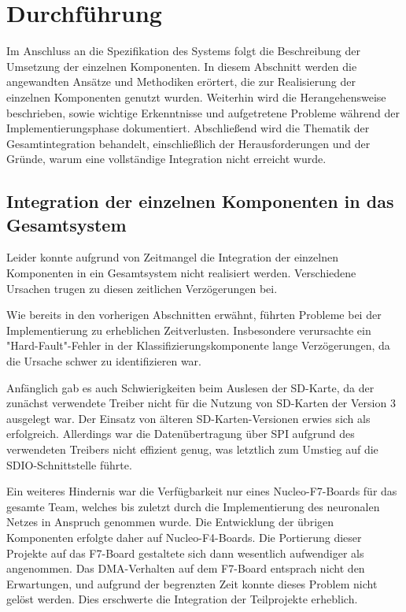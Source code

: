 \newpage
\section{Durchführung}
Im Anschluss an die Spezifikation des Systems folgt die Beschreibung der Umsetzung der einzelnen Komponenten. In diesem Abschnitt werden die angewandten Ansätze und Methodiken erörtert, die zur Realisierung der einzelnen Komponenten genutzt wurden. Weiterhin wird die Herangehensweise beschrieben, sowie wichtige Erkenntnisse und aufgetretene Probleme während der Implementierungsphase dokumentiert. Abschließend wird die Thematik der Gesamtintegration behandelt, einschließlich der Herausforderungen und der Gründe, warum eine vollständige Integration nicht erreicht wurde.







\subsection{Integration der einzelnen Komponenten in das Gesamtsystem}
\label{sec:no-gesamtintegration}
\vspace{1em}

Leider konnte aufgrund von Zeitmangel die Integration der einzelnen Komponenten in ein Gesamtsystem nicht realisiert werden. Verschiedene Ursachen trugen zu diesen zeitlichen Verzögerungen bei.

Wie bereits in den vorherigen Abschnitten erwähnt, führten Probleme bei der Implementierung zu erheblichen Zeitverlusten. Insbesondere verursachte ein "Hard-Fault"-Fehler in der Klassifizierungskomponente lange Verzögerungen, da die Ursache schwer zu identifizieren war.

Anfänglich gab es auch Schwierigkeiten beim Auslesen der SD-Karte, da der zunächst verwendete Treiber\cite{spi-sd-card} nicht für die Nutzung von SD-Karten der Version 3 ausgelegt war. Der Einsatz von älteren SD-Karten-Versionen erwies sich als erfolgreich. Allerdings war die Datenübertragung über SPI aufgrund des verwendeten Treibers nicht effizient genug, was letztlich zum Umstieg auf die SDIO-Schnittstelle führte.

Ein weiteres Hindernis war die Verfügbarkeit nur eines Nucleo-F7-Boards für das gesamte Team, welches bis zuletzt durch die Implementierung des neuronalen Netzes in Anspruch genommen wurde. Die Entwicklung der übrigen Komponenten erfolgte daher auf Nucleo-F4-Boards. Die Portierung dieser Projekte auf das F7-Board gestaltete sich dann wesentlich aufwendiger als angenommen. Das DMA-Verhalten auf dem F7-Board entsprach nicht den Erwartungen, und aufgrund der begrenzten Zeit konnte dieses Problem nicht gelöst werden. Dies erschwerte die Integration der Teilprojekte erheblich.

